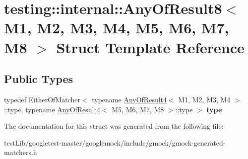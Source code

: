 \hypertarget{structtesting_1_1internal_1_1AnyOfResult8}{}\section{testing\+:\+:internal\+:\+:Any\+Of\+Result8$<$ M1, M2, M3, M4, M5, M6, M7, M8 $>$ Struct Template Reference}
\label{structtesting_1_1internal_1_1AnyOfResult8}
\subsection*{Public Types}
\begin{DoxyCompactItemize}
\item 
\mbox{\label{structtesting_1_1internal_1_1AnyOfResult8_a8f8a1e78a019965c24bd22c78885747d}} 
typedef Either\+Of\+Matcher$<$ typename \hyperlink{structtesting_1_1internal_1_1AnyOfResult4}{Any\+Of\+Result4}$<$ M1, M2, M3, M4 $>$\+::type, typename \hyperlink{structtesting_1_1internal_1_1AnyOfResult4}{Any\+Of\+Result4}$<$ M5, M6, M7, M8 $>$\+::type $>$ {\bfseries type}
\end{DoxyCompactItemize}


The documentation for this struct was generated from the following file\+:\begin{DoxyCompactItemize}
\item 
test\+Lib/googletest-\/master/googlemock/include/gmock/gmock-\/generated-\/matchers.\+h\end{DoxyCompactItemize}
